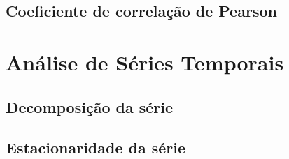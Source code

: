 
\lipsum[100]



\section{Coeficiente de correlação de Pearson}



\lipsum[100]



\chapter{Análise de Séries Temporais}



\lipsum[100]



\section{Decomposição da série}



\lipsum[100]



\section{Estacionaridade da série}



\lipsum[100]



